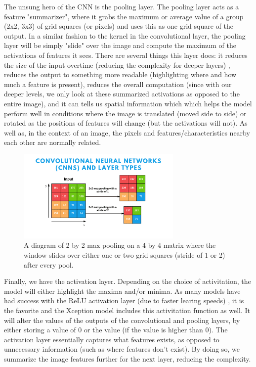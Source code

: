 \documentclass[10pt,twocolumn]{article}
\begin{document}
The unsung hero of the CNN is the pooling layer. The pooling layer acts as a feature "summarizer", where it grabs the maximum or average value of a group (2x2, 3x3) of grid squares (or pixels) and uses this as one grid square of the output. In a similar fashion to the kernel in the convolutional layer, the pooling layer will be simply "slide" over the image and compute the maximum of the activations of features it sees. There are several things this layer does: it reduces the size of the input overtime (reducing the complexity for deeper layers) \cite{Albawi2017}, reduces the output to something more readable (highlighting where and how much a feature is present), reduces the overall computation (since with our deeper levels, we only look at these summarized activations as opposed to the entire image), and it can tells us spatial information which which helps the model perform well in conditions where the image is translated (moved side to side) or rotated as the positions of features will change (but the activations will not). As well as, in the context of an image, the pixels and features/characteristics nearby each other are normally related.

\begin{figure}[h]
  \includegraphics[width=8cm]{max_pooling.png}
  \caption{A diagram of 2 by 2 max pooling on a 4 by 4 matrix where the window slides over either one or two grid squares (stride of 1 or 2) after every pool.}
  \centering
\end{figure}

Finally, we have the activation layer. Depending on the choice of activitation, the model will either highlight the maxima and/or minima. As many models have had success with the ReLU activation layer (due to faster learing speeds) \cite{Ide2017}, it is the favorite and the Xception model includes this activitation function as well. It will alter the values of the outputs of the convolutional and pooling layers, by either storing a value of 0 or the value (if the value is higher than 0). The activation layer essentially captures what features exists, as opposed to unnecessary information (such as where features don't exist). By doing so, we summarize the image features further for the next layer, reducing the complexity.
\end{document}
